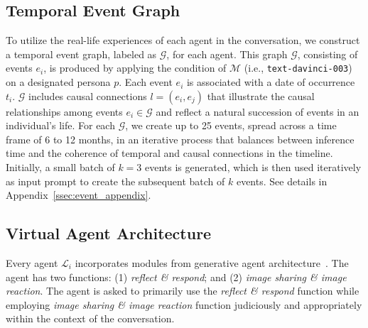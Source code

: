 \subsection{Temporal Event Graph} 
\label{ssec:temporal-event}
To utilize the real-life experiences of each agent in the conversation, we construct a temporal event graph, labeled as $\mathcal{G}$, for each agent. 
This graph $\mathcal{G}$, consisting of events $e_{i}$, is produced by applying the condition of $\mathcal{M}$ (i.e., \texttt{text-davinci-003}) on a designated persona $p$. Each event $e_{i}$ is associated with a date of occurrence $t_{i}$.
$\mathcal{G}$ includes causal connections $l = (e_i, e_j)$ that illustrate the causal relationships among events $e_i \in \mathcal{G}$ and reflect a natural succession of events in an individual's life. For each $\mathcal{G}$, we create up to 25 events, spread across a time frame of 6 to 12 months, in an iterative process that balances between inference time and the coherence of temporal and causal connections in the timeline. Initially, a small batch of $k=3$ events is generated, which is then used iteratively as input prompt to create the subsequent batch of $k$ events. See details in Appendix~\ref{ssec:event_appendix}.




\subsection{Virtual Agent Architecture}
\label{ssec:llm-agent}
Every agent $\mathcal{L}_i$  incorporates modules from generative agent architecture~\cite{park2023generative}.
The agent has two functions: (1) \textit{reflect \& respond}; and (2) \textit{image sharing \& image reaction}.
The agent is asked to primarily use the \textit{reflect \& respond} function while employing \textit{image sharing \& image reaction} function judiciously and appropriately within the context of the conversation.


